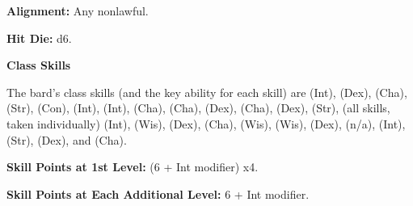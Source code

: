 

\textbf{Alignment:} Any nonlawful.

\textbf{Hit Die:} d6.

\textbf{Class Skills}

The bard's class skills (and the key ability for each skill) are  (Int), 
 (Dex),  (Cha),  (Str),  (Con),  (Int),  (Int),  (Cha),  (Cha),  (Dex),  
(Cha),  (Dex),  (Str),  (all skills, taken individually) (Int), 
 (Wis),  (Dex),  (Cha),  (Wis),  
(Wis),  (Dex),  (n/a),  (Int),  (Str), 
 (Dex), and  (Cha).

\textbf{Skill Points at 1st Level:} (6 + Int modifier) x4.

\textbf{Skill Points at Each Additional Level:} 6 + Int modifier.

